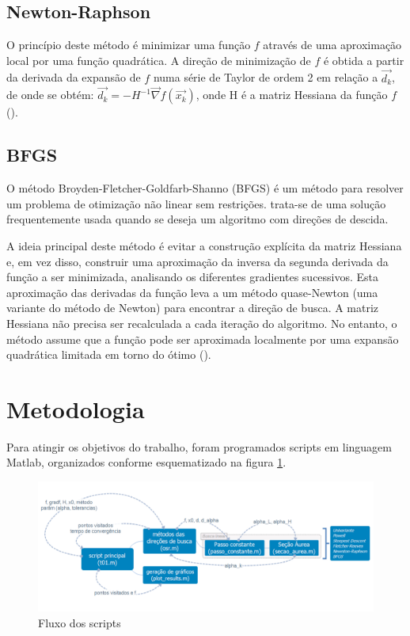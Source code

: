 \documentclass[10pt, a4paper]{article}
\begin{document}
\subsection{Newton-Raphson}

O princ\'ipio deste m\'etodo \'e minimizar uma fun\c c\~ao $f$ atrav\'es de uma aproxima\c c\~ao local por uma fun\c c\~ao quadr\'atica. A dire\c c\~ao de minimiza\c c\~ao de $f$ \'e obtida a partir da derivada da expans\~ao de $f$ numa s\'erie de Taylor de ordem 2 em rela\c c\~ao a $\vec{d_{k}}$, de onde se obt\'em: $\vec{d_{k}}=-H^{-1} \vec{\nabla} f(\vec{x_{k}})$, onde H \'e a matriz Hessiana da fun\c c\~ao $f$ (\cite{apostila}).

\subsection{BFGS}

O m\'etodo Broyden-Fletcher-Goldfarb-Shanno (BFGS) \'e um m\'etodo para resolver um problema de otimiza\c c\~ao n\~ao linear sem restri\c c\~oes. trata-se de uma solu\c c\~ao frequentemente usada quando se deseja um algoritmo com dire\c c\~oes de descida.

A ideia principal deste m\'etodo \'e evitar a constru\c c\~ao expl\'icita da matriz Hessiana e, em vez disso, construir uma aproxima\c c\~ao da inversa da segunda derivada da fun\c c\~ao a ser minimizada, analisando os diferentes gradientes sucessivos. Esta aproxima\c c\~ao das derivadas da fun\c c\~ao leva a um m\'etodo quase-Newton (uma variante do m\'etodo de Newton) para encontrar a dire\c c\~ao de busca. A matriz Hessiana n\~ao precisa ser recalculada a cada itera\c c\~ao do algoritmo. No entanto, o m\'etodo assume que a fun\c c\~ao pode ser aproximada localmente por uma expans\~ao quadr\'atica limitada em torno do \'otimo (\cite{bfgs}).

\section{Metodologia}

Para atingir os objetivos do trabalho, foram programados scripts em linguagem Matlab, organizados conforme esquematizado na figura \ref{fig:fluxo}.

\begin{figure}[H]
      \centering
      \includegraphics[width=.9\textwidth]{t01.png}
      \caption{Fluxo dos scripts}
      \label{fig:fluxo}
\end{figure}
\end{document}
